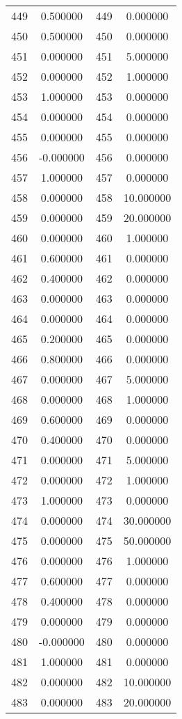 \documentclass[12pt]{article}
\begin{document}
\begin{longtable}{@{}cccc@{}}
449 & 0.500000 & 449 & 0.000000 \\
450 & 0.500000 & 450 & 0.000000 \\
451 & 0.000000 & 451 & 5.000000 \\
452 & 0.000000 & 452 & 1.000000 \\
453 & 1.000000 & 453 & 0.000000 \\
454 & 0.000000 & 454 & 0.000000 \\
455 & 0.000000 & 455 & 0.000000 \\
456 & -0.000000 & 456 & 0.000000 \\
457 & 1.000000 & 457 & 0.000000 \\
458 & 0.000000 & 458 & 10.000000 \\
459 & 0.000000 & 459 & 20.000000 \\
460 & 0.000000 & 460 & 1.000000 \\
461 & 0.600000 & 461 & 0.000000 \\
462 & 0.400000 & 462 & 0.000000 \\
463 & 0.000000 & 463 & 0.000000 \\
464 & 0.000000 & 464 & 0.000000 \\
465 & 0.200000 & 465 & 0.000000 \\
466 & 0.800000 & 466 & 0.000000 \\
467 & 0.000000 & 467 & 5.000000 \\
468 & 0.000000 & 468 & 1.000000 \\
469 & 0.600000 & 469 & 0.000000 \\
470 & 0.400000 & 470 & 0.000000 \\
471 & 0.000000 & 471 & 5.000000 \\
472 & 0.000000 & 472 & 1.000000 \\
473 & 1.000000 & 473 & 0.000000 \\
474 & 0.000000 & 474 & 30.000000 \\
475 & 0.000000 & 475 & 50.000000 \\
476 & 0.000000 & 476 & 1.000000 \\
477 & 0.600000 & 477 & 0.000000 \\
478 & 0.400000 & 478 & 0.000000 \\
479 & 0.000000 & 479 & 0.000000 \\
480 & -0.000000 & 480 & 0.000000 \\
481 & 1.000000 & 481 & 0.000000 \\
482 & 0.000000 & 482 & 10.000000 \\
483 & 0.000000 & 483 & 20.000000 \\

\end{longtable}
\end{document}
